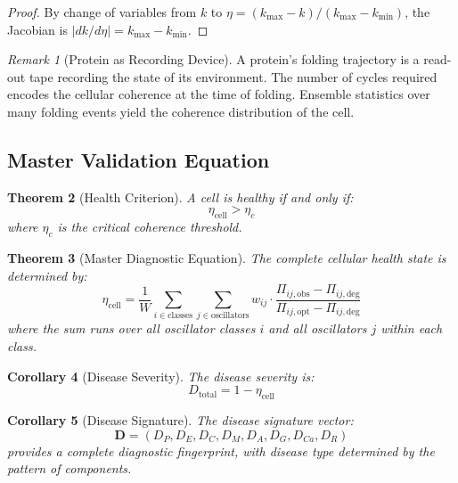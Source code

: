 \documentclass[aps,prd,twocolumn,superscriptaddress,floatfix,nofootinbib]{revtex4-2}
\newtheorem{theorem}{Theorem}[section]
\newtheorem{corollary}[theorem]{Corollary}
\theoremstyle{remark}
\newtheorem{remark}[theorem]{Remark}
\begin{document}
\begin{proof}
By change of variables from $k$ to $\eta = (k_{\max} - k)/(k_{\max} - k_{\min})$, the Jacobian is $|dk/d\eta| = k_{\max} - k_{\min}$.
\end{proof}

\begin{remark}[Protein as Recording Device]
A protein's folding trajectory is a read-out tape recording the state of its environment. The number of cycles required encodes the cellular coherence at the time of folding. Ensemble statistics over many folding events yield the coherence distribution of the cell.
\end{remark}

\subsection{Master Validation Equation}

\begin{theorem}[Health Criterion]
\label{thm:health_criterion}
A cell is healthy if and only if:
\begin{equation}
\eta_{\mathrm{cell}} > \eta_c
\end{equation}
where $\eta_c$ is the critical coherence threshold.
\end{theorem}

\begin{theorem}[Master Diagnostic Equation]
\label{thm:master_diagnostic}
The complete cellular health state is determined by:
\begin{equation}
\boxed{
\eta_{\mathrm{cell}} = \frac{1}{W}\sum_{i \in \mathrm{classes}} \sum_{j \in \mathrm{oscillators}} w_{ij} \cdot \frac{\Pi_{ij,\mathrm{obs}} - \Pi_{ij,\mathrm{deg}}}{\Pi_{ij,\mathrm{opt}} - \Pi_{ij,\mathrm{deg}}}
}
\label{eq:master_diagnostic}
\end{equation}
where the sum runs over all oscillator classes $i$ and all oscillators $j$ within each class.
\end{theorem}

\begin{corollary}[Disease Severity]
The disease severity is:
\begin{equation}
D_{\mathrm{total}} = 1 - \eta_{\mathrm{cell}}
\end{equation}
\end{corollary}

\begin{corollary}[Disease Signature]
The disease signature vector:
\begin{equation}
\mathbf{D} = (D_P, D_E, D_C, D_M, D_A, D_G, D_{Ca}, D_R)
\end{equation}
provides a complete diagnostic fingerprint, with disease type determined by the pattern of components.
\end{corollary}
\end{document}

